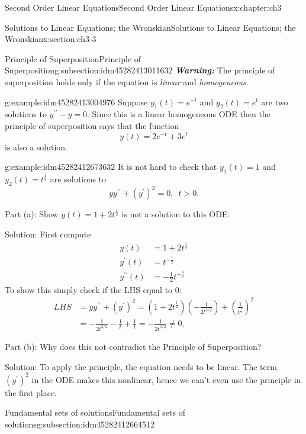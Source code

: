 \documentclass[oneside,10pt,]{book}
\newcommand{\alert}[1]{\textbf{\textit{#1}}}
\numberwithin{equation}{section}
\numberwithin{equation}{section}
\newcommand{\amp}{&}
\begin{document}
\begin{chapterptx}{Second Order Linear Equations}{}{Second Order Linear Equations}{}{}{x:chapter:ch3}
\begin{sectionptx}{Solutions to Linear Equations; the Wronskian}{}{Solutions to Linear Equations; the Wronskian}{}{}{x:section:ch3-3}
\begin{subsectionptx}{Principle of Superposition}{}{Principle of Superposition}{}{}{g:subsection:idm45282413011632}
\alert{Warning:} The principle of superposition holds only if the equation is \emph{linear} and \emph{homogeneous}.%
\begin{example}{}{g:example:idm45282413004976}%
Suppose \(y_{1}(t)=e^{-t}\) and \(y_{2}(t)=e^{t}\) are two solutions to \(y^{\prime\prime}-y=0\). Since this is a linear homogeneous ODE then the principle of superposition says that the function%
\begin{equation*}
y(t)=2e^{-t}+3e^{t}
\end{equation*}
is also a solution.%
\end{example}
\begin{example}{}{g:example:idm45282412673632}%
It is not hard to check that \(y_{1}(t)=1\) and \(y_{2}(t)=t^{\frac{1}{2}}\) are solutions to%
\begin{equation*}
yy^{\prime\prime}+\left(y^{\prime}\right)^{2}=0,\,\,\,t>0.
\end{equation*}
%
\par
Part (a): Show \(y(t)=1+2t^{\frac{1}{2}}\) is not a solution to this ODE:%
\par
Solution: First compute%
\begin{align*}
y(t) \amp =1+2t^{\frac{1}{2}}\\
y^{\prime}(t) \amp =t^{-\frac{1}{2}}\\
y^{\prime\prime}(t) \amp =-\frac{1}{2}t^{-\frac{3}{2}}
\end{align*}
To show this simply check if the LHS equal to \(0\):%
\begin{align*}
LHS \amp =yy^{\prime\prime}+\left(y^{\prime}\right)^{2}=\left(1+2t^{\frac{1}{2}}\right)\left(-\frac{1}{2t^{3/2}}\right)+\left(\frac{1}{t^{\frac{1}{2}}}\right)^{2}\\
\amp =-\frac{1}{2t^{3/2}}-\frac{1}{t}+\frac{1}{t}=-\frac{1}{2t^{3/2}}\neq0,
\end{align*}
%
\par
Part (b): Why does this not contradict the Principle of Superposition?%
\par
Solution: To apply the principle, the equation needs to be linear. The term \(\left(y^{\prime}\right)^{2}\) in the ODE makes this nonlinear, hence we can't even use the principle in the first place.%
\end{example}
\end{subsectionptx}
%
%
\typeout{************************************************}
\typeout{************************************************}
%
\begin{subsectionptx}{Fundamental sets of solutions}{}{Fundamental sets of solutions}{}{}{g:subsection:idm45282412664512}

\end{subsectionptx}
\end{sectionptx}
\end{chapterptx}
\end{document}
